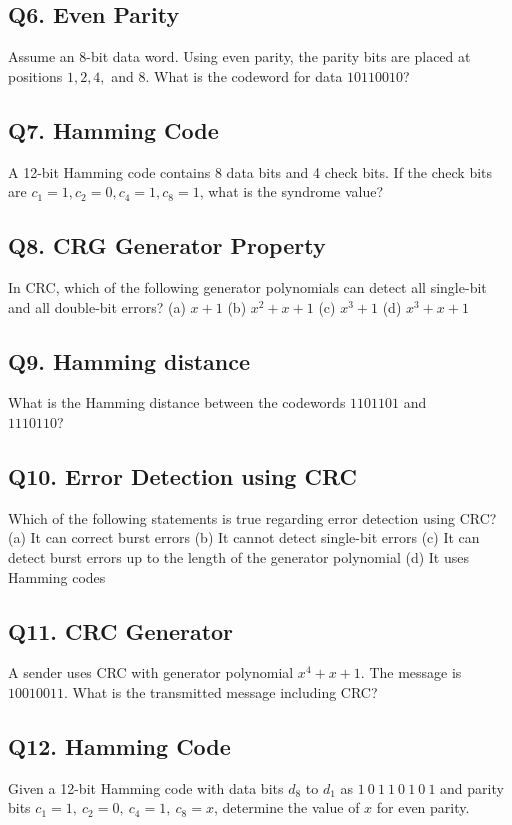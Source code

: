 \subsection*{Q6. Even Parity}
Assume an 8-bit data word. Using even parity, the parity bits are placed at positions $1, 2, 4,$ and $8$. What is the codeword for data $10110010$?

\subsection*{Q7. Hamming Code}
A 12-bit Hamming code contains 8 data bits and 4 check bits. If the check bits are $c_1=1, c_2=0, c_4=1, c_8=1$, what is the syndrome value?

\subsection*{Q8. CRG Generator Property}
In CRC, which of the following generator polynomials can detect all single-bit and all double-bit errors?  
(a) $x + 1$  
(b) $x^2 + x + 1$  
(c) $x^3 + 1$  
(d) $x^3 + x + 1$

\subsection*{Q9. Hamming distance}
What is the Hamming distance between the codewords $1101101$ and\\ 
$1110110$?

\subsection*{Q10. Error Detection using CRC}
Which of the following statements is true regarding error detection using CRC?  
(a) It can correct burst errors  
(b) It cannot detect single-bit errors  
(c) It can detect burst errors up to the length of the generator polynomial  
(d) It uses Hamming codes

\subsection*{Q11. CRC Generator}
A sender uses CRC with generator polynomial $x^4 + x + 1$. The message is $10010011$. What is the transmitted message including CRC?

\subsection*{Q12. Hamming Code}
Given a 12-bit Hamming code with data bits $d_8$ to $d_1$ as $1\ 0\ 1\ 1\ 0\ 1\ 0\ 1$ and parity bits $c_1 = 1,\ c_2 = 0,\ c_4 = 1,\ c_8 = x$, determine the value of $x$ for even parity.

